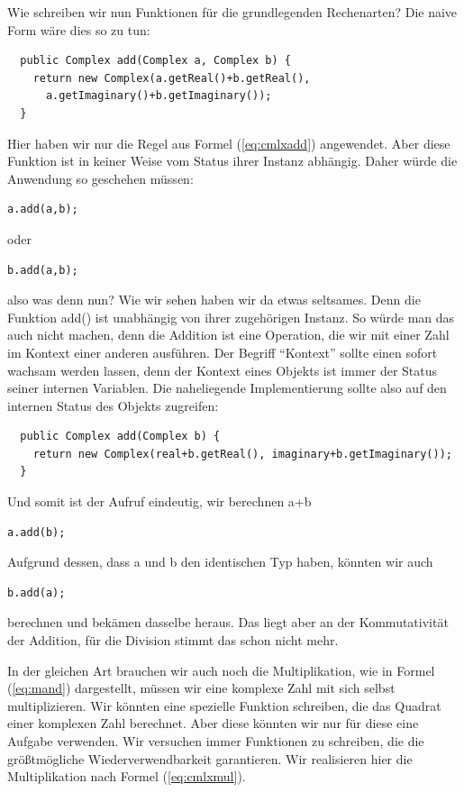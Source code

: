 Wie schreiben wir nun Funktionen für die grundlegenden Rechenarten? Die naive Form wäre dies so zu tun:
\begin{lstlisting}
  public Complex add(Complex a, Complex b) {
    return new Complex(a.getReal()+b.getReal(), 
      a.getImaginary()+b.getImaginary());
  }
\end{lstlisting}
Hier haben wir nur die Regel aus Formel (\ref{eq:cmlxadd}) angewendet. Aber diese Funktion ist in keiner Weise vom Status ihrer Instanz abhängig. Daher würde die Anwendung so geschehen müssen:
\begin{lstlisting}
a.add(a,b);
\end{lstlisting}
oder
\begin{lstlisting}
b.add(a,b);
\end{lstlisting}
also was denn nun? Wie wir sehen haben wir da etwas seltsames. Denn die Funktion add() ist unabhängig von ihrer zugehörigen Instanz. So würde man das auch nicht machen, denn die Addition ist eine Operation, die wir mit einer Zahl im Kontext einer anderen ausführen. Der Begriff "`Kontext"' sollte einen sofort wachsam werden lassen, denn der Kontext eines Objekts ist immer der Status seiner internen Variablen. Die naheliegende Implementierung sollte also auf den internen Status des Objekts zugreifen:
\begin{lstlisting}
  public Complex add(Complex b) {
    return new Complex(real+b.getReal(), imaginary+b.getImaginary());
  }
\end{lstlisting}
Und somit ist der Aufruf eindeutig, wir berechnen a+b
\begin{lstlisting}
a.add(b);
\end{lstlisting}
Aufgrund dessen, dass a und b den identischen Typ haben, könnten wir auch 
\begin{lstlisting}
b.add(a);
\end{lstlisting}
berechnen und bekämen dasselbe heraus. Das liegt aber an der Kommutativität der Addition, für die Division stimmt das schon nicht mehr.

In der gleichen Art brauchen wir auch noch die Multiplikation, wie in Formel (\ref{eq:mand}) dargestellt, müssen wir eine komplexe Zahl mit sich selbst multiplizieren. Wir könnten eine spezielle Funktion schreiben, die das Quadrat einer komplexen Zahl berechnet. Aber diese könnten wir nur für diese eine Aufgabe verwenden. Wir versuchen immer Funktionen zu schreiben, die die größtmögliche Wiederverwendbarkeit garantieren. Wir realisieren hier die Multiplikation nach Formel (\ref{eq:cmlxmul}). 

